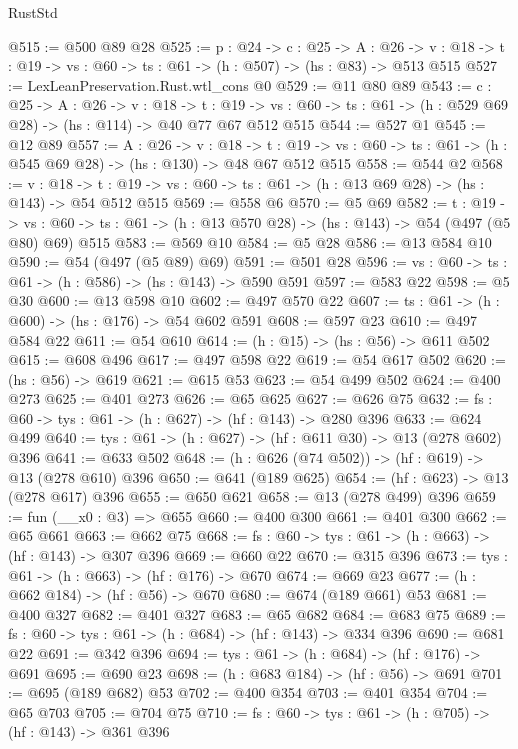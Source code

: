 \begin{lexlean}{RustStd}
\begin{coremodule}
@515 := @500 @89 @28
@525 := {p : @24} ->
  {c : @25} ->
  {A : @26} ->
  {v : @18} -> {t : @19} -> {vs : @60} -> {ts : @61} -> (h : @507) -> (hs : @83) -> @513 @515
@527 := LexLeanPreservation.Rust.wtl_cons @0
@529 := @11 @80 @89
@543 := {c : @25} ->
  {A : @26} ->
  {v : @18} ->
  {t : @19} ->
  {vs : @60} -> {ts : @61} -> (h : @529 @69 @28) -> (hs : @114) -> @40 @77 @67 @512 @515
@544 := @527 @1
@545 := @12 @89
@557 := {A : @26} ->
  {v : @18} ->
  {t : @19} -> {vs : @60} -> {ts : @61} -> (h : @545 @69 @28) -> (hs : @130) -> @48 @67 @512 @515
@558 := @544 @2
@568 := {v : @18} ->
  {t : @19} -> {vs : @60} -> {ts : @61} -> (h : @13 @69 @28) -> (hs : @143) -> @54 @512 @515
@569 := @558 @6
@570 := @5 @69
@582 := {t : @19} ->
  {vs : @60} -> {ts : @61} -> (h : @13 @570 @28) -> (hs : @143) -> @54 (@497 (@5 @80) @69) @515
@583 := @569 @10
@584 := @5 @28
@586 := @13 @584 @10
@590 := @54 (@497 (@5 @89) @69)
@591 := @501 @28
@596 := {vs : @60} -> {ts : @61} -> (h : @586) -> (hs : @143) -> @590 @591
@597 := @583 @22
@598 := @5 @30
@600 := @13 @598 @10
@602 := @497 @570 @22
@607 := {ts : @61} -> (h : @600) -> (hs : @176) -> @54 @602 @591
@608 := @597 @23
@610 := @497 @584 @22
@611 := @54 @610
@614 := (h : @15) -> (hs : @56) -> @611 @502
@615 := @608 @496
@617 := @497 @598 @22
@619 := @54 @617 @502
@620 := (hs : @56) -> @619
@621 := @615 @53
@623 := @54 @499 @502
@624 := @400 @273
@625 := @401 @273
@626 := @65 @625
@627 := @626 @75
@632 := {fs : @60} -> {tys : @61} -> (h : @627) -> (hf : @143) -> @280 @396
@633 := @624 @499
@640 := {tys : @61} -> (h : @627) -> (hf : @611 @30) -> @13 (@278 @602) @396
@641 := @633 @502
@648 := (h : @626 (@74 @502)) -> (hf : @619) -> @13 (@278 @610) @396
@650 := @641 (@189 @625)
@654 := (hf : @623) -> @13 (@278 @617) @396
@655 := @650 @621
@658 := @13 (@278 @499) @396
@659 := fun (__x0 : @3) => @655
@660 := @400 @300
@661 := @401 @300
@662 := @65 @661
@663 := @662 @75
@668 := {fs : @60} -> {tys : @61} -> (h : @663) -> (hf : @143) -> @307 @396
@669 := @660 @22
@670 := @315 @396
@673 := {tys : @61} -> (h : @663) -> (hf : @176) -> @670
@674 := @669 @23
@677 := (h : @662 @184) -> (hf : @56) -> @670
@680 := @674 (@189 @661) @53
@681 := @400 @327
@682 := @401 @327
@683 := @65 @682
@684 := @683 @75
@689 := {fs : @60} -> {tys : @61} -> (h : @684) -> (hf : @143) -> @334 @396
@690 := @681 @22
@691 := @342 @396
@694 := {tys : @61} -> (h : @684) -> (hf : @176) -> @691
@695 := @690 @23
@698 := (h : @683 @184) -> (hf : @56) -> @691
@701 := @695 (@189 @682) @53
@702 := @400 @354
@703 := @401 @354
@704 := @65 @703
@705 := @704 @75
@710 := {fs : @60} -> {tys : @61} -> (h : @705) -> (hf : @143) -> @361 @396

\end{coremodule}
\end{lexlean}

